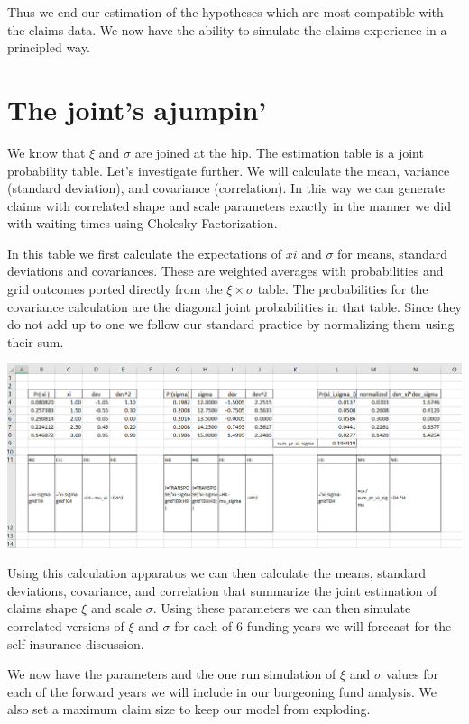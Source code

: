 \documentclass[
]{book}
\begin{document}
Thus we end our estimation of the hypotheses which are most compatible with the claims data. We now have the ability to simulate the claims experience in a principled way.

\hypertarget{the-joints-ajumpin}{%
\section{The joint's ajumpin'}\label{the-joints-ajumpin}}

We know that \(\xi\) and \(\sigma\) are joined at the hip. The estimation table is a joint probability table. Let's investigate further. We will calculate the mean, variance (standard deviation), and covariance (correlation). In this way we can generate claims with correlated shape and scale parameters exactly in the manner we did with waiting times using Cholesky Factorization.

In this table we first calculate the expectations of \(xi\) and \(\sigma\) for means, standard deviations and covariances. These are weighted averages with probabilities and grid outcomes ported directly from the \(\xi \times \sigma\) table. The probabilities for the covariance calculation are the diagonal joint probabilities in that table. Since they do not add up to one we follow our standard practice by normalizing them using their sum.

\includegraphics{images/06/claims-xi-sigma-parm.jpg}

Using this calculation apparatus we can then calculate the means, standard deviations, covariance, and correlation that summarize the joint estimation of claims shape \(\xi\) and scale \(\sigma\). Using these parameters we can then simulate correlated versions of \(\xi\) and \(\sigma\) for each of 6 funding years we will forecast for the self-insurance discussion.

We now have the parameters and the one run simulation of \(\xi\) and \(\sigma\) values for each of the forward years we will include in our burgeoning fund analysis. We also set a maximum claim size to keep our model from exploding.
\end{document}
